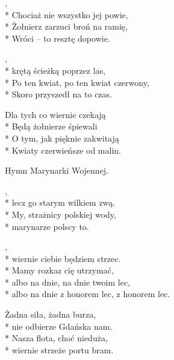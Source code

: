 \begin{lyrics}[longestline={Po ten kwiat, po ten kwiat czerwony,}]

,\\*
Chociaż nie wszystko jej powie,\\*
Żołnierz zarzuci broń na ramię,\\*
Wróci -- to resztę dopowie.

\begin{chorus}
,\\*
krętą ścieżką poprzez las,\\*
Po ten kwiat, po ten kwiat czerwony,\\*
Skoro przyszedł na to czas.
\end{chorus}

Dla tych co wiernie czekają\\*
Będą żołnierze śpiewali\\*
O tym, jak pięknie zakwitają\\*
Kwiaty czerwieńsze od malin.

\chorusref
\end{lyrics}



\begin{info}Hymn Marynarki Wojennej.\end{info}

\begin{lyrics}[longestline={albo na dnie z honorem lec, z honorem lec.}]

,\\*
lecz go starym wilkiem zwą.\\*
My, strażnicy polskiej wody,\\*
marynarze polscy to.

\begin{chorus}
,\\*
wiernie ciebie będziem strzec.\\*
Mamy rozkaz cię utrzymać,\\*
albo na dnie, na dnie twoim lec,\\*
albo na dnie z honorem lec, z honorem lec.
\end{chorus}

Żadna siła, żadna burza,\\*
nie odbierze Gdańska nam.\\*
Nasza flota, choć nieduża,\\*
wiernie strzeże portu bram.

\chorusref
\end{lyrics}
